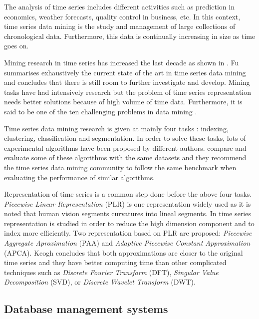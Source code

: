 The analysis of time series includes different activities such as prediction in economics, weather forecasts, quality control in business, etc. In this context, time series data mining is the study and management of large collections of chronological data. Furthermore, this data is continually increasing in size as time goes on.

Mining research in time series has increased the last decade as shown in \textcite{fu11}. Fu summarises exhaustively the current state of the art in time series data mining  and concludes that there is still room to further investigate and develop. Mining tasks have had intensively research but the problem of  time series representation needs better solutions because of high volume of time data. Furthermore, it is said to be one of the ten challenging problems in data mining \parencite{yangwu06}.
 
Time series data mining research  is given at mainly four tasks \parencite{keogh02}: indexing, clustering, classification and segmentation. In order to solve these tasks, lots of experimental algorithms have been proposed by different authors. \textcite{keogh02} compare and evaluate some of these algorithms with the same datasets and they recommend the time series data mining community to follow the same benchmark when evaluating the performance of similar algorithms. 

Representation of time series is a common step done before the above four tasks.
\emph{Piecewise Linear Representation} (PLR) \parencite{keogh97,keogh98}  is one representation widely used as it is noted that human vision segments curvatures into lineal segments. In \textcite{keogh00,keogh01} time series representation is studied in order to reduce the high dimension component and to index more efficiently. Two representation based on PLR are proposed: \emph{Piecewise Aggregate Aproximation} (PAA) and \emph{Adaptive Piecewise Constant Approximation} (APCA). Keogh concludes that both approximations are closer to the original time series and they have better computing time than other complicated techniques such as \emph{Discrete Fourier Transform} (DFT), \emph{Singular Value Decomposition} (SVD), or \emph{Discrete Wavelet Transform} (DWT).



\subsection{Database management systems}

